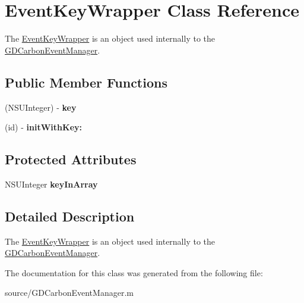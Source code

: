 \hypertarget{interface_event_key_wrapper}{
\section{EventKeyWrapper Class Reference}
\label{interface_event_key_wrapper}
}


The \hyperlink{interface_event_key_wrapper}{EventKeyWrapper} is an object used internally to the \hyperlink{interface_g_d_carbon_event_manager}{GDCarbonEventManager}.  
\subsection*{Public Member Functions}
\begin{DoxyCompactItemize}
\item 
\hypertarget{interface_event_key_wrapper_aadb96c3d2f22a762e63bf6c3f6362e17}{
(NSUInteger) -\/ {\bfseries key}}
\label{interface_event_key_wrapper_aadb96c3d2f22a762e63bf6c3f6362e17}

\item 
\hypertarget{interface_event_key_wrapper_ab2ed0afe2d80835ca02187c59315159d}{
(id) -\/ {\bfseries initWithKey:}}
\label{interface_event_key_wrapper_ab2ed0afe2d80835ca02187c59315159d}

\end{DoxyCompactItemize}
\subsection*{Protected Attributes}
\begin{DoxyCompactItemize}
\item 
\hypertarget{interface_event_key_wrapper_afe7c15f44098176f90f28812bfdb810f}{
NSUInteger {\bfseries keyInArray}}
\label{interface_event_key_wrapper_afe7c15f44098176f90f28812bfdb810f}

\end{DoxyCompactItemize}


\subsection{Detailed Description}
The \hyperlink{interface_event_key_wrapper}{EventKeyWrapper} is an object used internally to the \hyperlink{interface_g_d_carbon_event_manager}{GDCarbonEventManager}. 

The documentation for this class was generated from the following file:\begin{DoxyCompactItemize}
\item 
source/GDCarbonEventManager.m\end{DoxyCompactItemize}
